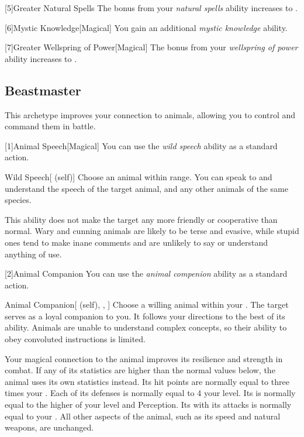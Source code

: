        [5]{Greater Natural Spells} The bonus from your \textit{natural spells} ability increases to .

        [6]{Mystic Knowledge}[Magical]
        You gain an additional \textit{mystic knowledge} ability.

        [7]{Greater Wellspring of Power}[Magical]
        The bonus from your \textit{wellspring of power} ability increases to .

    \subsection{Beastmaster}
        This archetype improves your connection to animals, allowing you to control and command them in battle.

        [1]{Animal Speech}[Magical] You can use the \textit{wild speech} ability as a standard action.
        \begin{attuneability}{Wild Speech}[ (self)]
            Choose an animal within \rnglong range.
            You can speak to and understand the speech of the target animal, and any other animals of the same species.

            This ability does not make the target any more friendly or cooperative than normal.
            Wary and cunning animals are likely to be terse and evasive, while stupid ones tend to make inane comments and are unlikely to say or understand anything of use.
        \end{attuneability}

        [2]{Animal Companion}
        You can use the \textit{animal compenion} ability as a standard action.
        \begin{attuneability}{Animal Companion}[ (self), , ]
            Choose a willing animal within your .
            The target serves as a loyal companion to you.
            It follows your directions to the best of its ability.
            Animals are unable to understand complex concepts, so their ability to obey convoluted instructions is limited.

            Your magical connection to the animal improves its resilience and strength in combat.
            If any of its statistics are higher than the normal values below, the animal uses its own statistics instead.
            Its hit points are normally equal to three times your .
            Each of its defenses is normally equal to 4 \add your level.
            Its  is normally equal to the higher of your level and Perception.
            Its  with its attacks is normally equal to your .
            All other aspects of the animal, such as its speed and natural weapons, are unchanged.
        \end{attuneability}

